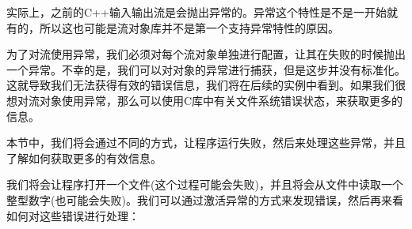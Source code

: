 实际上，之前的C++输入输出流是会抛出异常的。异常这个特性是不是一开始就有的，所以这也可能是流对象库并不是第一个支持异常特性的原因。

为了对流使用异常，我们必须对每个流对象单独进行配置，让其在失败的时候抛出一个异常。不幸的是，我们可以对对象的异常进行捕获，但是这步并没有标准化。这就导致我们无法获得有效的错误信息，我们将在后续的实例中看到。如果我们很想对流对象使用异常，那么可以使用C库中有关文件系统错误状态，来获取更多的信息。

本节中，我们将会通过不同的方式，让程序运行失败，然后来处理这些异常，并且了解如何获取更多的有效信息。


我们将会让程序打开一个文件(这个过程可能会失败)，并且将会从文件中读取一个整型数字(也可能会失败)。我们可以通过激活异常的方式来发现错误，然后再来看如何对这些错误进行处理：

